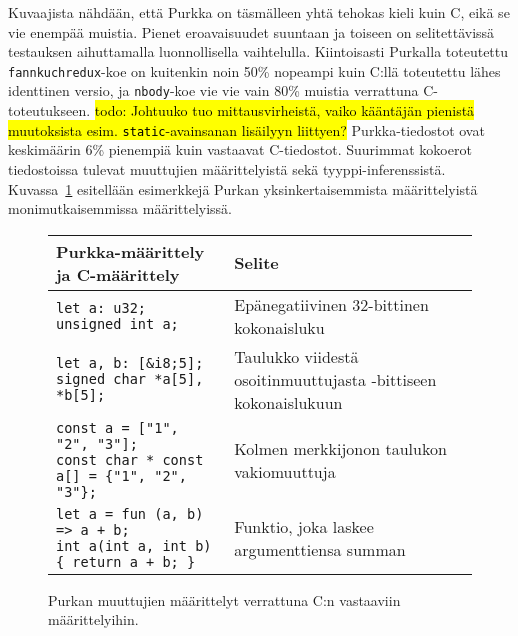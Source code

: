 Kuvaajista nähdään, että Purkka on täsmälleen yhtä tehokas kieli kuin C, eikä
se vie enempää muistia. Pienet eroavaisuudet suuntaan ja toiseen on
selitettävissä testauksen aihuttamalla luonnollisella vaihtelulla. Kiintoisasti
Purkalla toteutettu \texttt{fannkuchredux}-koe on kuitenkin noin 50\% nopeampi
kuin C:llä toteutettu lähes identtinen versio, ja \texttt{nbody}-koe vie vie
vain 80\% muistia verrattuna C-toteutukseen. \hl{todo: Johtuuko tuo
mittausvirheistä, vaiko kääntäjän pienistä muutoksista esim.
\texttt{static}-avainsanan lisäilyyn liittyen?} Purkka-tiedostot ovat
keskimäärin 6\% pienempiä kuin vastaavat C-tiedostot. Suurimmat kokoerot
tiedostoissa tulevat muuttujien määrittelyistä sekä tyyppi-inferenssistä.
Kuvassa~\ref{fig:declarations} esitellään esimerkkejä Purkan
yksinkertaisemmista määrittelyistä monimutkaisemmissa määrittelyissä.

\begin{figure}[ht!]
    \begin{adjustbox}{center}
        \begin{tabular}{@{} m{} m{} @{}} \toprule
            Purkka-määrittely ja C-määrittely & Selite \\ \midrule

            \texttt{let a: u32; \newline unsigned int a;} & Epänegatiivinen 32-bittinen kokonaisluku \\
            \noalign{\vspace{0.3cm}}

            \texttt{let a, b: [\&i8;5]; \newline signed char *a[5], *b[5];} & Taulukko viidestä osoitinmuuttujasta \newline 8-bittiseen kokonaislukuun \\
            \noalign{\vspace{0.3cm}}

            \texttt{const a = ["1", "2", "3"]; \newline const char * const a[] = \{"1", "2", "3"\};} & Kolmen merkkijonon taulukon vakiomuuttuja \\
            \noalign{\vspace{0.3cm}}

            \texttt{let a = fun (a, b) => a + b; \newline int a(int a, int b) \{ return a + b; \}} & Funktio, joka laskee argumenttiensa summan \\ \bottomrule
        \end{tabular}
    \end{adjustbox}
    \label{fig:declarations}
    \caption{Purkan muuttujien määrittelyt verrattuna C:n vastaaviin
    määrittelyihin.}
\end{figure}


